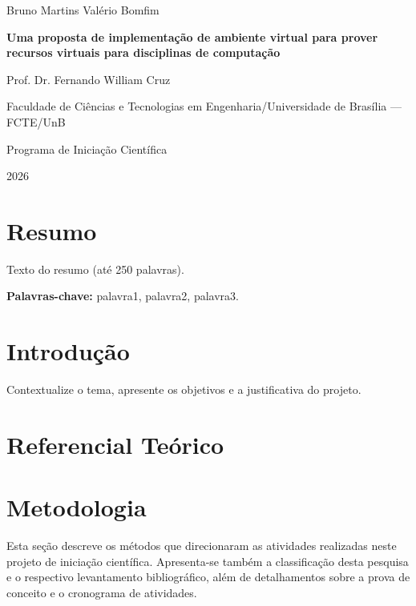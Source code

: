 \documentclass[12pt]{article}
\newcommand{\nomealuno}{Bruno Martins Valério Bomfim}
\newcommand{\titulotrabalho}{Uma proposta de implementação de ambiente virtual para prover recursos virtuais para disciplinas de computação}
\newcommand{\nomeorientador}{Prof. Dr. Fernando William Cruz}
\newcommand{\instituicao}{Faculdade de Ciências e Tecnologias em Engenharia/Universidade de Brasília — FCTE/UnB}
\newcommand{\programa}{Programa de Iniciação Científica}
\newcommand{\anorealizacao}{2026}
\begin{document}
\begin{center}
    {\large \nomealuno}

    \vspace{0.3cm}

    {\Large \bfseries \titulotrabalho}

    \vspace{0.3cm}

    {\large \nomeorientador}

    \vspace{0.3cm}

    {\large \instituicao}

    \vspace{0.3cm}

    {\large \programa}

    \vspace{0.3cm}

    {\large \anorealizacao}
\end{center}

\vspace{1cm}

\section*{Resumo}
Texto do resumo (até 250 palavras).

\vspace{0.5cm}
\noindent \textbf{Palavras-chave:} palavra1, palavra2, palavra3.

\newpage

\section{Introdução}
\label{intro}

Contextualize o tema, apresente os objetivos e a justificativa do projeto.


\section{Referencial Teórico}

\section{Metodologia}

Esta seção descreve os métodos que direcionaram as atividades realizadas neste projeto de iniciação científica. Apresenta-se também a classificação desta pesquisa e o respectivo levantamento bibliográfico, além de detalhamentos sobre a prova de conceito e o cronograma de atividades.
\end{document}
